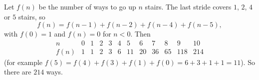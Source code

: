 Let $f(n)$ be the number of ways to go up $n$ stairs. The last stride covers $1$, $2$, $4$ or $5$ stairs, so
\[f(n)=f(n-1)+f(n-2)+f(n-4)+f(n-5),\]
with $f(0)=1$ and $f(n)=0$ for $n<0$. Then
\[\begin{array}{c|ccccccccccc}n&0&1&2&3&4&5&6&7&8&9&10\\ \hline f(n)&1&1&2&3&6&11&20&36&65&118&214\end{array}\]
(for example $f(5)=f(4)+f(3)+f(1)+f(0)=6+3+1+1=11$). So there are $\boxed{214}$ ways.
